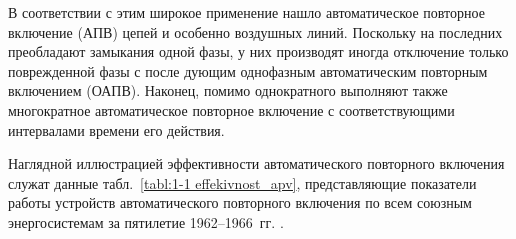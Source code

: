 В соответствии с этим широкое применение нашло автоматическое повторное включение (АПВ) цепей и особенно воздушных линий. Поскольку на последних преобладают замыкания одной фазы, у них производят иногда отключение только поврежденной фазы с после дующим однофазным автоматическим повторным включением (ОАПВ). Наконец, помимо однократного выполняют также многократное автоматическое повторное включение с соответствующими интервалами времени его действия.

Наглядной иллюстрацией эффективности автоматического повторного включения служат данные табл.~\ref{tabl:1-1 effekivnost_apv}, представляющие показатели работы устройств автоматического повторного включения по всем союзным энергосистемам за пятилетие 1962--1966~гг. \cite{14Zeilndzon69}.


